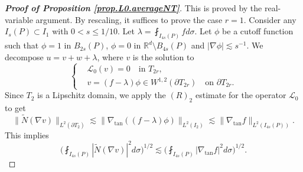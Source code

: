\documentclass[reqno,12pt]{amsart} %
\theoremstyle{definition}
\theoremstyle{remark}
\numberwithin{equation}{section}
\newcommand{\cL}{\mathcal{L}}
\newcommand{\R}{\mathbb{R}}
\begin{document}
\begin{proof}[\textbf{Proof of Proposition \ref{prop.L0.averageNT}}]
    This is proved by the real-variable argument. By rescaling, it suffices to prove the case $r = 1$. Consider any $I_s(P) \subset I_1$ with $0 < s \le 1/10$. Let $\lambda = \fint_{I_{4s}(P)} f d\sigma$. Let $\phi$ be a cutoff function such that $\phi = 1$ in $B_{2s}(P)$, $\phi = 0$ in $\R^d\setminus B_{4s}(P)$ and $|\nabla \phi| \lesssim s^{-1}$. We decompose $u = v + w+\lambda$, where $v$ is the solution to
    \begin{equation}
    \left\{
    \begin{aligned}
        & \cL_0(v) = 0 \quad \text{in } T_{2r}, \\
        & v = (f - \lambda)\phi \in W^{1,2}(\partial T_{2r}) \quad \text{on } \partial T_{2r}.
    \end{aligned}
    \right.
    \end{equation}
    Since $T_2$ is a Lipschitz domain, we apply the $(R)_2$ estimate for the operator $\cL_0$ to get
    \begin{equation}
        \| \widetilde{N}(\nabla v) \|_{L^2(\partial T_2)} \lesssim \| \nabla_{\tan} ((f-\lambda) \phi ) \|_{L^2(I_{2})} \lesssim \| \nabla_{\tan} f \|_{L^2(I_{4s}(P))}.
    \end{equation}
    This implies
    \begin{equation}\label{est.localu0.v}
        \bigg( \fint_{I_{4s}(P)} |\widetilde{N}(\nabla v)|^2 d\sigma \bigg)^{1/2} \lesssim \bigg( \fint_{I_{4s}(P)} |\nabla_{\tan} f|^2 d\sigma \bigg)^{1/2}.
    \end{equation}


\end{proof}
\end{document}
